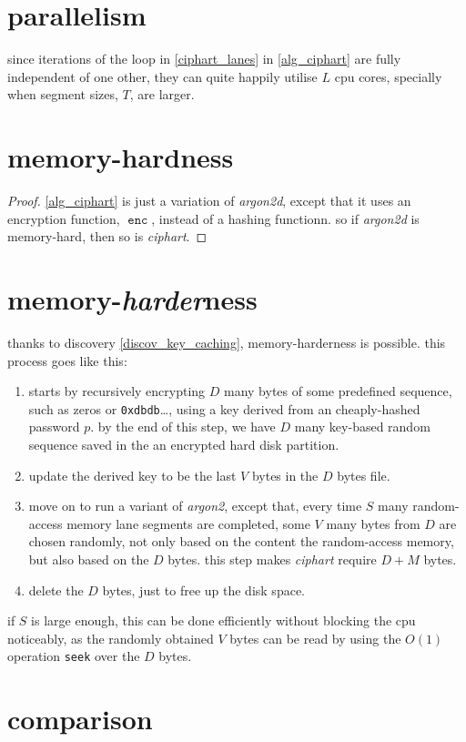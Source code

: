 \documentclass[twocolumn]{article}
\DeclareMathOperator{\enc}{\mathtt{enc}}
\begin{document}
\section{parallelism}
since iterations of the loop in \cref{ciphart_lanes} in \cref{alg_ciphart}
are fully independent of one other, they can quite happily utilise $L$ cpu
cores, specially when segment sizes, $T$, are larger.

\section{memory-hardness}
\begin{proof}
    \cref{alg_ciphart} is just a variation of \emph{argon2d}, except that
    it uses an encryption function, $\enc$, instead of a hashing functionn.
    so if \emph{argon2d} is memory-hard, then so is \emph{ciphart}.
\end{proof}


\section{memory-\emph{harder}ness}
thanks to discovery \ref{discov_key_caching}, memory-harderness is
possible.  this process goes like this:
\begin{enumerate}
    \item starts by recursively encrypting $D$ many bytes of some
    predefined sequence, such as zeros or \texttt{0xdbdb}\ldots, using a
    key derived from an cheaply-hashed password $p$.  by the end of this
    step, we have $D$ many key-based random sequence saved in the an
    encrypted hard disk partition.

    \item update the derived key to be the last $V$ bytes in the $D$ bytes
    file.

    \item move on to run a variant of \emph{argon2}, except that, every
    time $S$ many random-access memory lane segments are completed, some
    $V$ many bytes from $D$ are chosen randomly, not only based on the
    content the random-access memory, but also based on the $D$ bytes.
    this step makes \emph{ciphart} require $D+M$ bytes.

    \item delete the $D$ bytes, just to free up the disk space.
\end{enumerate}

if $S$ is large enough, this can be done efficiently without blocking the
cpu noticeably, as the randomly obtained $V$ bytes can be read by using
the $O(1)$ operation \texttt{seek} over the $D$ bytes.

\section{comparison}
\end{document}
